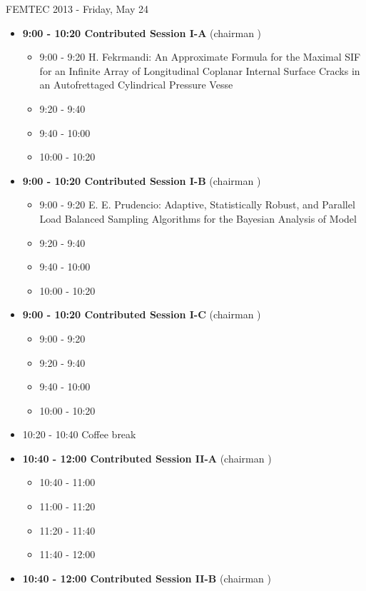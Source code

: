 \documentclass[10pt, A4]{article}%
\begin{document}
\centerline{\huge FEMTEC 2013 - Friday, May 24}
\vspace{4mm}
\begin{itemize}    
\item {\bf 9:00 - 10:20 Contributed Session I-A} (chairman ) 
  \begin{itemize}
    \item 9:00 - 9:20 {H. Fekrmandi}: {An Approximate Formula for the Maximal SIF for an Infinite Array of Longitudinal Coplanar Internal Surface Cracks in an Autofrettaged Cylindrical Pressure Vesse}
    \item 9:20 - 9:40 
    \item 9:40 - 10:00 
    \item 10:00 - 10:20  
  \end{itemize}
  \item {\bf 9:00 - 10:20 Contributed Session I-B} (chairman ) 
  \begin{itemize}
    \item 9:00 - 9:20 {E. E. Prudencio}: {Adaptive, Statistically Robust, and Parallel Load Balanced Sampling Algorithms for the Bayesian Analysis of Model}
    \item 9:20 - 9:40 
    \item 9:40 - 10:00 
    \item 10:00 - 10:20      
  \end{itemize}
    \item {\bf 9:00 - 10:20 Contributed Session I-C} (chairman ) 
  \begin{itemize}
    \item 9:00 - 9:20 
    \item 9:20 - 9:40 
    \item 9:40 - 10:00 
    \item 10:00 - 10:20      
  \end{itemize}
  \item 10:20 - 10:40 Coffee break
  \item {\bf 10:40 - 12:00 Contributed Session II-A} (chairman ) 
  \begin{itemize}
    \item 10:40 - 11:00 
    \item 11:00 - 11:20 
    \item 11:20 - 11:40 
    \item 11:40 - 12:00 
  \end{itemize}
  \item {\bf 10:40 - 12:00 Contributed Session II-B} (chairman ) 
  \begin{itemize}

\end{itemize}
\end{itemize}
\end{document}
